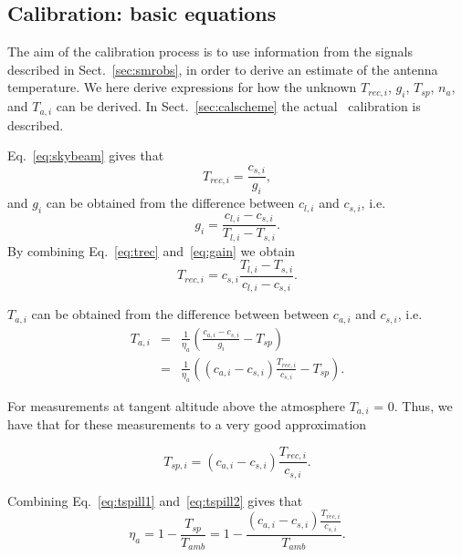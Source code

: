 \subsection{Calibration: basic equations}
\label{sec:caleq}
The aim of the calibration process is to use  
information from the signals described in Sect.~\ref{sec:smrobs},
in order to derive an estimate of the antenna temperature.
We here derive expressions for how the unknown \(T_{rec,i}\),
\(g_{i}\), \(T_{sp}\), \(n_{a}\), and \(T_{a,i}\) can be derived.
In Sect.~\ref{sec:calscheme} the actual \smr\ calibration is described. 

Eq.~\ref{eq:skybeam} gives that
\begin{equation}
\label{eq:trec}
T_{rec,i}=\frac{c_{s,i}}{g_{i}},
\end{equation}
and \(g_{i}\) can be obtained from the difference between \(c_{l,i}\) and
 \(c_{s,i}\), i.e.
\begin{equation}
\label{eq:gain}
g_{i}=\frac{c_{l,i}-c_{s,i}}{T_{l,i}-T_{s,i}}.
\end{equation}
By combining Eq.~\ref{eq:trec} and~\ref{eq:gain} we obtain
\begin{equation}
\label{eq:trec2}
T_{rec,i}=c_{s,i}\frac{{T_{l,i}-T_{s,i}}}{c_{l,i}-c_{s,i}}.
\end{equation}

\(T_{a,i}\) can be obtained from the difference between between
\(c_{a,i}\) and \(c_{s,i}\), i.e.
\begin{eqnarray}
\label{eq:ta}
T_{a,i} &=& \frac{1}{\eta_{a}}\left(\frac{c_{a,i}-c_{s,i}}{g_{i}} - T_{sp}\right) \nonumber\\
 &=& \frac{1}{\eta_{a}}\left( \left(c_{a,i} - c_{s,i}\right)\frac{T_{rec,i}}{c_{s,i}} -T_{sp} \right). 
\end{eqnarray}

For measurements at tangent altitude above the atmosphere
\(T_{a,i}\) = 0. Thus, we have that for these measurements
to a very good approximation

\begin{equation}
\label{eq:tspill2}
T_{sp,i}= \left(c_{a,i}-c_{s,i}\right)\frac{T_{rec,i}}{c_{s,i}}.
\end{equation}

Combining Eq.~\ref{eq:tspill1} and~\ref{eq:tspill2} gives that
\begin{equation}
\label{eq:eta}
\eta_{a}=1-\frac{T_{sp}}{T_{amb}}=1-\frac{\left(c_{a,i}-c_{s,i}\right)\frac{T_{rec,i}}{c_{s,i}}}{T_{amb}}.
\end{equation}

